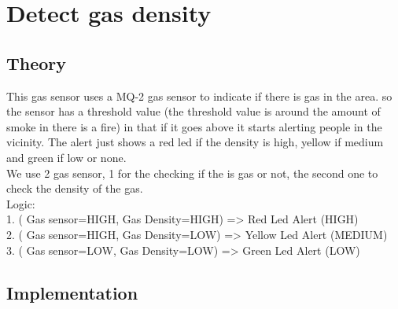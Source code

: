 \documentclass[a4paper]{article}
\begin{document}
\newpage
\section{Detect gas density}
\subsection{Theory}
This gas sensor uses a MQ-2 gas sensor to indicate if there is gas in the area. so the sensor has a threshold value (the threshold value is around the amount of smoke in there is a fire) in that if it goes above it starts alerting people in the vicinity. The alert just shows a red led if the density is high, yellow if medium and green if low or none.\bigskip\\
We use 2 gas sensor, 1 for the checking if the is gas or not, the second one to check the density of the gas.\bigskip\\
Logic:\\
    1. ( Gas sensor=HIGH, Gas Density=HIGH) => Red Led Alert (HIGH)\\
    2. ( Gas sensor=HIGH, Gas Density=LOW) => Yellow Led Alert (MEDIUM)\\
    3. ( Gas sensor=LOW, Gas Density=LOW) => Green Led Alert (LOW)
\subsection{Implementation}
\end{document}
